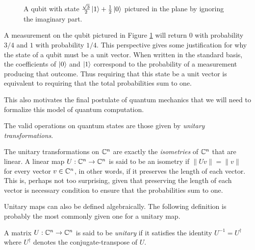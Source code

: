         \begin{figure}[ht]
            \centering
            \begin{center}
            \end{center}
            \caption{A qubit with state $\frac{\sqrt{3}}{2}\ket{1} + \frac{1}{2}\ket{0}$ pictured in the plane by 
            ignoring the imaginary part. }
            \label{qubit-depiction}
    \end{figure}

    A measurement on the qubit pictured in Figure \ref{qubit-depiction} will return 0 with probability $3/4$ and 
    $1$ with probability $1/4$.  This perspective gives some justification for why the state of a qubit must be a 
    unit vector.  When written in the standard basis, the coefficients of $\ket{0}$ and $\ket{1}$ correspond to the 
    probability of a measurement producing that outcome. Thus requiring that this state be a unit vector is 
    equivalent to requiring that the total probabilities sum to one.


    This also motivates the final postulate of quantum mechanics that we will need to formalize this model of 
    quantum computation. 

    \begin{postulate}
        The valid operations on quantum states are those given by \emph{unitary transformations}.
    \end{postulate}
    
    The unitary transformations on $\mathbb{C}^n$ are exactly the \emph{isometries} of $\mathbb{C}^n$ that are linear. A linear map 
    $U : \mathbb{C}^n \rightarrow \mathbb{C}^n$ is said to be an isometry if $\| Uv \| = \|v\|$ for every vector $v \in \mathbb{C}^n$, in 
    other words, if it preserves the length of each vector.  This is, perhaps not too surprising, given that 
    preserving the length of each vector is necessary condition to ensure that the probabilities sum to one. 
    
    Unitary maps can also be defined algebraically. The following definition is probably the most commonly given 
    one for a unitary map.
    \begin{definition}
        A matrix $U : \mathbb{C}^n \rightarrow \mathbb{C}^n$ is said to be \emph{unitary} if it satisfies the identity $U^{-1} = 
        U^\dagger$ where $U^\dagger$ denotes the conjugate-transpose of $U$.
    \end{definition}

